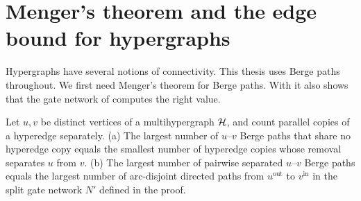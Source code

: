 
\section{Menger's theorem and the edge bound for hypergraphs}\label{sec:hyper-menger}

Hypergraphs have several notions of connectivity.
This thesis uses Berge paths throughout.
We first need Menger's theorem for Berge paths. With  it also shows that the gate network of  computes the right value.

\begin{theorem}\label{thm:menger-hyper}
Let $u,v$ be distinct vertices of a multihypergraph $\mathcal{H}$, and count parallel copies of a hyperedge separately.
(a) The largest number of $u$--$v$ Berge paths that share no hyperedge copy equals the smallest number of hyperedge copies whose removal separates $u$ from $v$.
(b) The largest number of pairwise separated $u$--$v$ Berge paths equals the largest number of arc-disjoint directed paths from $u^{\mathrm{out}}$ to $v^{\mathrm{in}}$ in the split gate network $N'$ defined in the proof.
\end{theorem}

